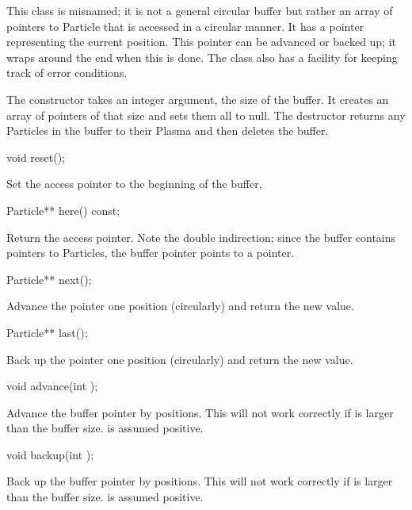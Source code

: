 This class is misnamed; it is not a general circular buffer but
rather an array of pointers to Particle that is accessed in a
circular manner.  It has a pointer representing the current position.
This pointer can be advanced or backed up; it wraps around the end
when this is done.  The class also has a facility for keeping
track of error conditions.

The constructor takes an integer argument, the size of the buffer.
It creates an array of pointers of that size and sets them all to
null.  The destructor returns any Particles in the buffer to their
Plasma and then deletes the buffer.

\begin{example}
void reset();
\end{example}

Set the access pointer to the beginning of the buffer.

\begin{example}
Particle** here() const;
\end{example}

Return the access pointer.  Note the double indirection; since the
buffer contains pointers to Particles, the buffer pointer points
to a pointer.

\begin{example}
Particle** next();
\end{example}

Advance the pointer one position (circularly) and return the new value.

\begin{example}
Particle** last();
\end{example}

Back up the pointer one position (circularly) and return the new value.

\begin{example}
void advance(int );
\end{example}

Advance the buffer pointer by  positions.  This will not work correctly
if  is larger than the buffer size.   is assumed positive.

\begin{example}
void backup(int );
\end{example}

Back up the buffer pointer by  positions.  This will not work correctly
if  is larger than the buffer size.   is assumed positive.

